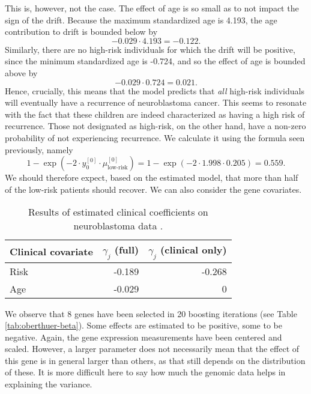 This is, however, not the case.
The effect of age is so small as to not impact the sign of the drift.
Because the maximum standardized age is 4.193, the age contribution to drift is bounded below by 
\begin{equation*}
    -0.029\cdot4.193=-0.122.
\end{equation*}
Similarly, there are no high-risk individuals for which the drift will be positive, since the minimum standardized age is -0.724, and so the effect of age is bounded above by
\begin{equation*}
    -0.029\cdot0.724=0.021.
\end{equation*}
Hence, crucially, this means that the model predicts that \textit{all} high-risk individuals will eventually have a recurrence of neuroblastoma cancer.
This seems to resonate with the fact that these children are indeed characterized as having a high risk of recurrence.
Those not designated as high-risk, on the other hand, have a non-zero probability of not experiencing recurrence.
We calculate it using the formula seen previously, namely
\begin{equation*}
    1-\exp{(-2\cdot y_{0}^{[0]}\cdot\mu_{\text{low-risk}}^{[0]})}=1-\exp{(-2\cdot 1.998\cdot 0.205)}=0.559.
\end{equation*}
We should therefore expect, based on the estimated model, that more than half of the low-risk patients should recover.
We can also consider the gene covariates.

\begin{table}
\caption{Results of estimated clinical coefficients on neuroblastoma data \citep{oberthuer-data}.}
\label{tab:oberthuer-gamma}
\centering
\begin{tabular}{lrr}
\toprule
Clinical covariate & $\gamma_j$ (full) & $\gamma_j$ (clinical only)\\
\hline
Risk      &  -0.189  &  -0.268\\
Age       &  -0.029  &       0 \\
\bottomrule
\end{tabular}
\end{table}

We observe that 8 genes have been selected in 20 boosting iterations (see Table \ref{tab:oberthuer-beta}).
Some effects are estimated to be positive, some to be negative.
Again, the gene expression measurements have been centered and scaled.
However, a larger parameter does not necessarily mean that the effect of this gene is in general larger than others, as that still depends on the distribution of these.
It is more difficult here to say how much the genomic data helps in explaining the variance.

